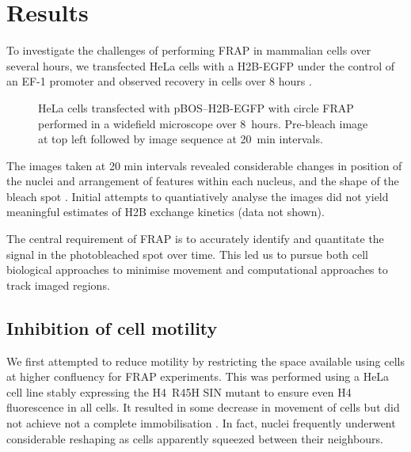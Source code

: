 \section{Results}

    To investigate the challenges of performing FRAP in mammalian cells over several hours,
    we transfected HeLa cells with a H2B-EGFP under the control of an EF-1\textalpha{} promoter
    and observed recovery in cells over 8 hours .
    
    \begin{figure}
      \centering
         {HeLa cells transfected with pBOS--H2B-EGFP
         with circle FRAP performed in a widefield microscope over 8~hours.
         Pre-bleach image at top left followed by image sequence at 20~min intervals.}
      \label{fig:kill-frap:cell-movement}
    \end{figure}

    The images taken at 20 min intervals revealed considerable changes
    in position of the nuclei and arrangement of features within each nucleus, 
    and the shape of the bleach spot .
    Initial attempts to quantiatively analyse the images
    did not yield meaningful estimates of H2B exchange kinetics (data not shown).

    The central requirement of FRAP is to accurately identify and 
    quantitate the signal in the photobleached spot over time.
    This led us to pursue both cell biological approaches to minimise movement 
    and computational approaches to track imaged regions.


  \subsection{Inhibition of cell motility}

    We first attempted to reduce motility by restricting the space available
    using cells at higher confluency for FRAP experiments.
    This was performed using a HeLa cell line stably expressing 
    the H4~R45H SIN mutant to ensure even H4 fluorescence in all cells.
    It resulted in some decrease in movement of cells
    but did not achieve not a complete immobilisation .
    In fact, nuclei frequently underwent considerable reshaping as cells 
    apparently squeezed between their neighbours.

